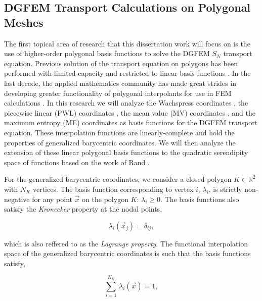 \documentclass[11pt]{article}
\begin{document}
\subsection{DGFEM Transport Calculations on Polygonal Meshes}
\label{sec::CW_poly}

The first topical area of research that this dissertation work will focus on is the use of higher-order polygonal basis functions to solve the DGFEM $S_N$ transport equation. Previous solution of the transport equation on polygons has been performed with limited capacity and restricted to linear basis functions \cite{davidson2008finite,ref::PWLD_stone_adams,ref::PWLD_stone_adams_unstructured,bailey2008phd}. In the last decade, the applied mathematics community has made great strides in developing greater functionality of polygonal interpolants for use in FEM calculations \cite{sukumar2006recent,manzini2014new}. In this research we will analyze the Wachspress coordinates \cite{wachspress1975rational}, the piecewise linear (PWL) coordinates \cite{ref::PWLD_stone_adams}, the mean value (MV) coordinates \cite{floater2003mean,hormann2006mean}, and the maximum entropy (ME) coordinates \cite{sukumar2004construction,sukumar2005maximum,hormann2008maximum} as basis functions for the DGFEM transport equation. These interpolation functions are linearly-complete and hold the properties of generalized barycentric coordinates. We will then analyze the extension of these linear polygonal basis functions to the quadratic serendipity space of functions based on the work of Rand \cite{rand2013interpolation}.

For the generalized barycentric coordinates, we consider a closed polygon $K \in \mathbb{R}^2$ with $N_K$ vertices. The basis function corresponding to vertex $i$, $\lambda_i$, is strictly non-negative for any point $\vec{x}$ on the polygon $K$: $\lambda_i \geq 0$. The basis functions also satisfy the {\em Kronecker} property at the nodal points, 

\begin{equation}
\label{eq::Lin_constant_constraint}
\lambda_i(\vec{x}_j) = \delta_{ij} ,
\end{equation}

\noindent which is also reffered to as the {\em Lagrange property}. The functional interpolation space of the generalized barycentric coordinates is such that the basis functions satisfy,

\begin{equation}
\label{eq::Lin_constant_constraint}
\sum_{i=1}^{N_K} \, \lambda_i(\vec{x}) = 1 ,
\end{equation}
\end{document}
